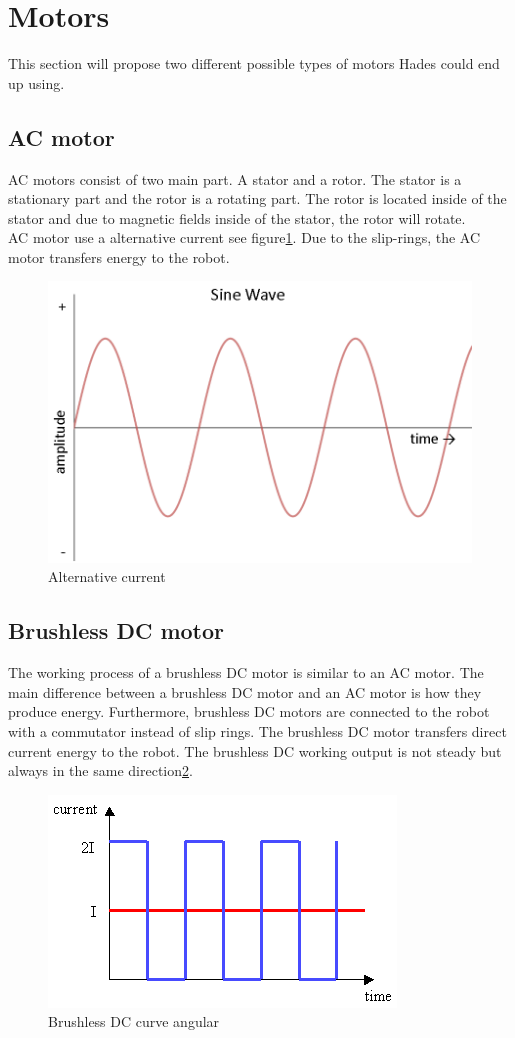 \section{Motors}
This section will propose two different possible types of motors Hades could end up using.

\subsection{AC motor}
AC motors consist of two main part. A stator and a rotor. The stator is a stationary part and the rotor is a rotating part. The rotor is located inside of the stator and due to magnetic fields inside of the stator, the rotor will rotate.\\ 
AC motor use a alternative current see figure\ref{fig:ACmotor}. Due to the slip-rings, the AC motor transfers energy to the robot.

\begin{figure}[h]
    \centering
    \includegraphics[width=.6\linewidth]{figures/wave.png}
    \caption{Alternative current\cite{ACmotor3}}
    \label{fig:ACmotor}
\end{figure}

\subsection{Brushless DC motor}
The working process of a brushless DC motor is similar to an AC motor. The main difference between a brushless DC motor and an AC motor is how they produce energy. Furthermore, brushless DC motors are connected to the robot with a commutator instead of slip rings. The brushless DC motor transfers direct current energy to the robot. The brushless DC working output is not steady but always in the same direction\ref{fig:DCmotor}.

\begin{figure}[h]
    \centering    \includegraphics[width=.6\linewidth]{figures/dcMotor.png}
    \caption{Brushless DC curve angular\cite{DCbrusshles}}
    \label{fig:DCmotor}
\end{figure}


